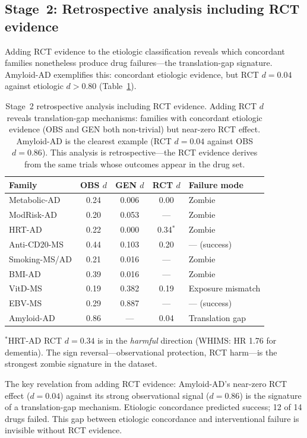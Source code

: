 \documentclass[11pt]{article}
\begin{document}
\subsection{Stage~2: Retrospective analysis including RCT evidence}
\label{sec:stage2}

Adding RCT evidence to the etiologic classification reveals which concordant families nonetheless produce drug failures---the translation-gap signature. Amyloid-AD exemplifies this: concordant etiologic evidence, but RCT $d = 0.04$ against etiologic $d > 0.80$ (Table~\ref{tab:stage2}).

\begin{table}[t]
\centering
\caption{Stage~2 retrospective analysis including RCT evidence. Adding RCT $d$ reveals translation-gap mechanisms: families with concordant etiologic evidence (OBS and GEN both non-trivial) but near-zero RCT effect. Amyloid-AD is the clearest example (RCT $d = 0.04$ against OBS $d = 0.86$). This analysis is retrospective---the RCT evidence derives from the same trials whose outcomes appear in the drug set.}
\label{tab:stage2}
\begin{tabular}{lcccl}
\toprule
Family & OBS $d$ & GEN $d$ & RCT $d$ & Failure mode \\
\midrule
Metabolic-AD & 0.24 & 0.006 & 0.00 & Zombie \\
ModRisk-AD & 0.20 & 0.053 & --- & Zombie \\
HRT-AD & 0.22 & 0.000 & 0.34$^*$ & Zombie \\
Anti-CD20-MS & 0.44 & 0.103 & 0.20 & --- (success) \\
Smoking-MS/AD & 0.21 & 0.016 & --- & Zombie \\
BMI-AD & 0.39 & 0.016 & --- & Zombie \\
VitD-MS & 0.19 & 0.382 & 0.19 & Exposure mismatch \\
EBV-MS & 0.29 & 0.887 & --- & --- (success) \\
Amyloid-AD & 0.86 & --- & 0.04 & Translation gap \\
\bottomrule
\end{tabular}

\vspace{1mm}
{\footnotesize $^*$HRT-AD RCT $d = 0.34$ is in the \emph{harmful} direction (WHIMS: HR 1.76 for dementia). The sign reversal---observational protection, RCT harm---is the strongest zombie signature in the dataset.}
\end{table}

The key revelation from adding RCT evidence: Amyloid-AD's near-zero RCT effect ($d = 0.04$) against its strong observational signal ($d = 0.86$) is the signature of a translation-gap mechanism. Etiologic concordance predicted success; 12 of 14 drugs failed. This gap between etiologic concordance and interventional failure is invisible without RCT evidence.
\end{document}
